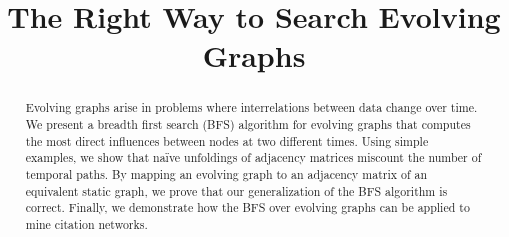 \documentclass[10pt,conference,compsocconf]{IEEEtran}
\theoremstyle{definition}
\begin{document}
%
\title{The Right Way to Search Evolving Graphs}


\author{
\and
{}
}

\maketitle

\begin{abstract}
Evolving graphs arise in problems where interrelations between data change over
time. We present a breadth first search (BFS) algorithm for evolving graphs
that computes the most direct influences between nodes at two different times.
Using simple examples, we show that na\"ive unfoldings of adjacency matrices
miscount the number of temporal paths.
By mapping an evolving graph to an adjacency matrix of an equivalent static graph,
we prove that our generalization of the BFS algorithm is correct.
Finally, we demonstrate how the BFS over evolving graphs can be applied to mine
citation networks.

\end{abstract}
\end{document}
